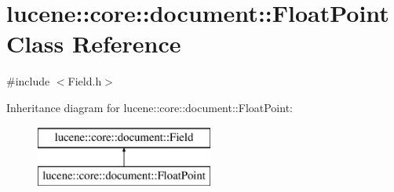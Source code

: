 \hypertarget{classlucene_1_1core_1_1document_1_1FloatPoint}{}\section{lucene\+:\+:core\+:\+:document\+:\+:Float\+Point Class Reference}
\label{classlucene_1_1core_1_1document_1_1FloatPoint}


{\ttfamily \#include $<$Field.\+h$>$}

Inheritance diagram for lucene\+:\+:core\+:\+:document\+:\+:Float\+Point\+:\begin{figure}[H]
\begin{center}
\leavevmode
\includegraphics[height=2.000000cm]{classlucene_1_1core_1_1document_1_1FloatPoint}
\end{center}
\end{figure}
